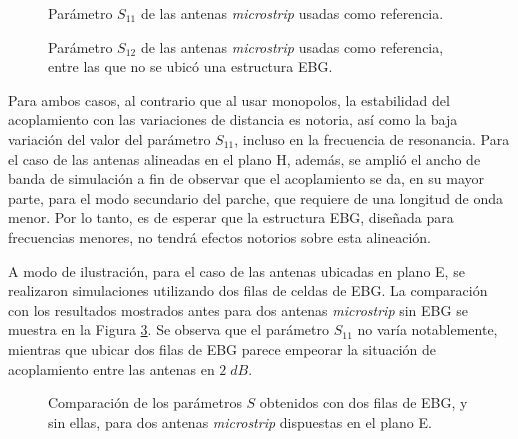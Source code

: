 \begin{figure}[H]
	\centering 
	\caption{Parámetro $S_{11}$ de las antenas \textit{microstrip} usadas como referencia.}
	\label{fig:sinebg-s11-microstrip}
\end{figure}



\begin{figure}[H]
	\centering 
	\caption{Parámetro $S_{12}$ de las antenas \textit{microstrip} usadas como referencia, entre las que no se ubicó una estructura EBG.}
	\label{fig:sinebg-s12-microstrip}
\end{figure}

Para ambos casos, al contrario que al usar monopolos, la estabilidad del acoplamiento con las variaciones de distancia es notoria, así como la baja variación del valor del parámetro $S_{11}$, incluso en la frecuencia de resonancia. Para el caso de las antenas alineadas en el plano H, además, se amplió el ancho de banda de simulación a fin de observar que el acoplamiento se da, en su mayor parte, para el modo secundario del parche, que requiere de una longitud de onda menor. Por lo tanto, es de esperar que la estructura EBG, diseñada para frecuencias menores, no tendrá efectos notorios sobre esta alineación.


A modo de ilustración, para el caso de las antenas ubicadas en plano E, se realizaron simulaciones utilizando dos filas de celdas de EBG. La comparación con los resultados mostrados antes para dos antenas \textit{microstrip} sin EBG se muestra en la Figura \ref{fig:planoh-2ebg-comparacion}. Se observa que el parámetro $S_{11}$ no varía notablemente, mientras que ubicar dos filas de EBG parece empeorar la situación de acoplamiento entre las antenas en $2\; dB$.

\begin{figure}[H]
	\centering 
	\caption{Comparación de los parámetros $S$ obtenidos con dos filas de EBG, y sin ellas, para dos antenas \textit{microstrip} dispuestas en el plano E.}
	\label{fig:planoh-2ebg-comparacion}
\end{figure}

